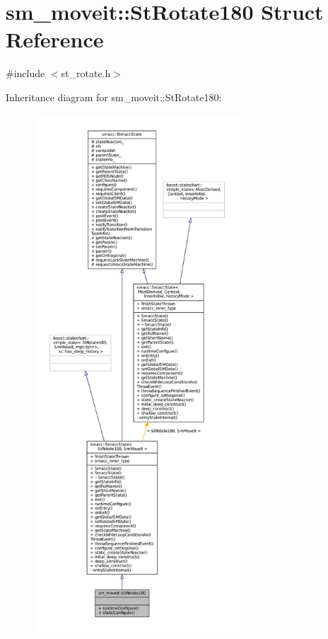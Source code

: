 \hypertarget{structsm__moveit_1_1StRotate180}{}\section{sm\+\_\+moveit\+:\+:St\+Rotate180 Struct Reference}
\label{structsm__moveit_1_1StRotate180}


{\ttfamily \#include $<$st\+\_\+rotate.\+h$>$}



Inheritance diagram for sm\+\_\+moveit\+:\+:St\+Rotate180\+:
\nopagebreak
\begin{figure}[H]
\begin{center}
\leavevmode
\includegraphics[height=550pt]{structsm__moveit_1_1StRotate180__inherit__graph}
\end{center}
\end{figure}


